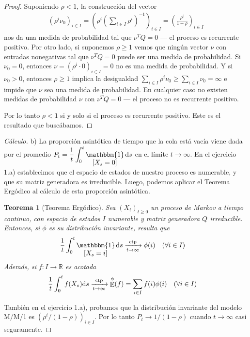 \documentclass{article}
\DeclareMathOperator{\Expectation}{\mathbb{E}}
\DeclareMathOperator{\characteristic}{\mathbbm{1}}
\newcommand{\realnum}{\mathbb{R}}
\newcommand{\almostSurely}{\textnormal{ctp}}
\newtheorem{theorem}{Teorema}
\theoremstyle{definition}
\begin{document}
\begin{proof}
Suponiendo \(\rho < 1\), la construcción del vector 
\begin{align}
	\left( \rho^i \nu_0 \right)_{i \in I}
	=
	\left( \rho^i \left(\sum_{i \in I} \rho^i\right)^{- 1} \right)_{i \in I}
	=
	\left( \frac{\rho^i}{1 - \rho} \right)_{i \in I}
\end{align}
nos da una medida de probabilidad tal que \(\nu^T Q = 0\) --- el proceso es recurrente positivo.
Por otro lado, si suponemos \(\rho \geq 1\) vemos que ningún vector \(\nu\) con entradas nonegativas tal que \(\nu^T Q = 0\) puede ser una medida de probabilidad.
Si \(\nu_0 = 0\), entonces \(\nu = (\rho^i \cdot 0)_{i \in I} = 0\) no es una medida de probabilidad.
Y si \(\nu_0 > 0\), entonces \(\rho \geq 1\) implica la desigualdad \(\sum_{i \in I} \rho^i \nu_0 \geq \sum_{i \in I} \nu_0 = \infty\) e impide que \(\nu\) sea una medida de probabilidad.
En cualquier caso no existen medidas de probabilidad \(\nu\) con \(\nu^T Q = 0\) --- el proceso no es recurrente positivo.

Por lo tanto \(\rho < 1\) si y solo si el proceso es recurrente positivo.
Este es el resultado que buscábamos.
\end{proof}

\begin{proof}[Cálculo] b)
La proporción asintótica de tiempo que la cola está vacía viene dada por el promedio \(P_t = {\displaystyle \frac{1}{t} \int_0^t \characteristic_{\displaystyle [X_s = 0]} \dd s}\) en el límite \(t \rightarrow \infty\).
En el ejercicio 1.a) establecimos que el espacio de estados de nuestro proceso es numerable, y que su matriz generadora es irreducible.
Luego, podemos aplicar el Teorema Ergódico al cálculo de esta proporción asintótica. 
\begin{theorem}[Teorema Ergódico]
\label{theorem:ErgodicTheoremForMarkovProcesses}
Sea \((X_t)_{t \geq 0}\) un proceso de Markov a tiempo continuo, con espacio de estados \(I\) numerable y matriz generadora \(Q\) irreducible.
Entonces, si \(\phi\) es su distribución invariante, resulta que
\begin{align}
	&\frac{1}{t} \int_0^t \characteristic_{\displaystyle [X_s = i]} \dd s
	\xrightarrow[t \rightarrow \infty]{\almostSurely}
	\phi(i)
	&&(\forall i \in I)
\end{align}
Además, si \(f : I \rightarrow \realnum\) es acotada
\begin{align}
	&\frac{1}{t} \int_0^t f(X_s) \dd s
	\xrightarrow[t \rightarrow \infty]{\almostSurely}
	\Expectation^{\phi}(f) = \sum_{i \in I} f(i) \phi(i)
	&&(\forall i \in I)
\end{align}
\end{theorem}
También en el ejercicio 1.a), probamos que la distribución invariante del modelo M/M/1 es \((\rho^i / (1 - \rho))_{i \in I}\).
Por lo tanto \(P_t \rightarrow 1 / (1 - \rho)\) cuando \(t \rightarrow \infty\) casi seguramente.
\end{proof}
\endgroup
\end{document}
